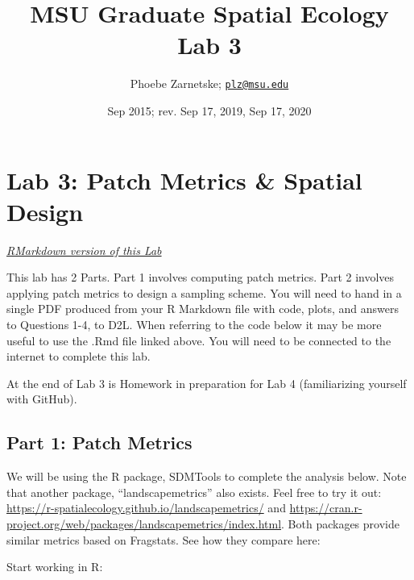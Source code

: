 \documentclass[
]{article}
\title{MSU Graduate Spatial Ecology Lab 3}
\author{Phoebe Zarnetske; \href{mailto:plz@msu.edu}{\nolinkurl{plz@msu.edu}}}
\date{Sep 2015; rev. Sep 17, 2019, Sep 17, 2020}
\begin{document}
\maketitle

\hypertarget{lab-3-patch-metrics-spatial-design}{%
\section{Lab 3: Patch Metrics \& Spatial
Design}\label{lab-3-patch-metrics-spatial-design}}

\emph{\href{lab3_patch_design.Rmd}{RMarkdown version of this Lab}}

This lab has 2 Parts. Part 1 involves computing patch metrics. Part 2
involves applying patch metrics to design a sampling scheme. You will
need to hand in a single PDF produced from your R Markdown file with
code, plots, and answers to Questions 1-4, to D2L. When referring to the
code below it may be more useful to use the .Rmd file linked above. You
will need to be connected to the internet to complete this lab.

At the end of Lab 3 is Homework in preparation for Lab 4 (familiarizing
yourself with GitHub).

\hypertarget{part-1-patch-metrics}{%
\subsection{Part 1: Patch Metrics}\label{part-1-patch-metrics}}

We will be using the R package, SDMTools to complete the analysis below.
Note that another package, ``landscapemetrics'' also exists. Feel free
to try it out:
\url{https://r-spatialecology.github.io/landscapemetrics/} and
\url{https://cran.r-project.org/web/packages/landscapemetrics/index.html}.
Both packages provide similar metrics based on Fragstats. See how they
compare here:

Start working in R:
\end{document}
